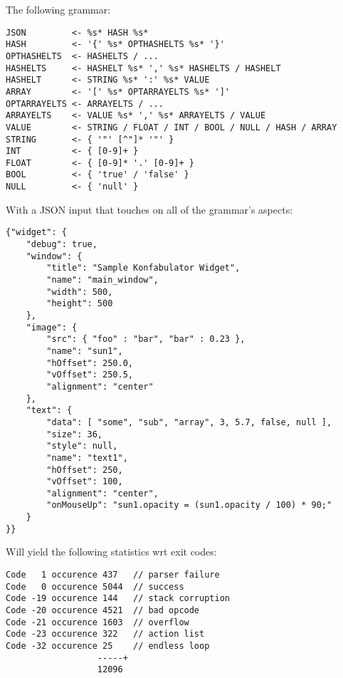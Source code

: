 The following grammar:

\begin{myquote}
\begin{verbatim}
JSON         <- %s* HASH %s*
HASH         <- '{' %s* OPTHASHELTS %s* '}'
OPTHASHELTS  <- HASHELTS / ...
HASHELTS     <- HASHELT %s* ',' %s* HASHELTS / HASHELT
HASHELT      <- STRING %s* ':' %s* VALUE
ARRAY        <- '[' %s* OPTARRAYELTS %s* ']'
OPTARRAYELTS <- ARRAYELTS / ...
ARRAYELTS    <- VALUE %s* ',' %s* ARRAYELTS / VALUE
VALUE        <- STRING / FLOAT / INT / BOOL / NULL / HASH / ARRAY
STRING       <- { '"' [^"]* '"' }
INT          <- { [0-9]+ }
FLOAT        <- { [0-9]* '.' [0-9]+ }
BOOL         <- { 'true' / 'false' }
NULL         <- { 'null' }

\end{verbatim}
\end{myquote}

With a JSON input that touches on all of the grammar's aspects:

\begin{myquote}
\begin{verbatim}
{"widget": {
    "debug": true,
    "window": {
        "title": "Sample Konfabulator Widget",
        "name": "main_window",
        "width": 500,
        "height": 500
    },
    "image": {
        "src": { "foo" : "bar", "bar" : 0.23 },
        "name": "sun1",
        "hOffset": 250.0,
        "vOffset": 250.5,
        "alignment": "center"
    },
    "text": {
        "data": [ "some", "sub", "array", 3, 5.7, false, null ],
        "size": 36,
        "style": null,
        "name": "text1",
        "hOffset": 250,
        "vOffset": 100,
        "alignment": "center",
        "onMouseUp": "sun1.opacity = (sun1.opacity / 100) * 90;"
    }
}}

\end{verbatim}
\end{myquote}

Will yield the following statistics wrt exit codes:

\begin{myquote}
\begin{verbatim}
Code   1 occurence 437   // parser failure
Code   0 occurence 5044  // success
Code -19 occurence 144   // stack corruption
Code -20 occurence 4521  // bad opcode
Code -21 occurence 1603  // overflow
Code -23 occurence 322   // action list
Code -32 occurence 25    // endless loop
                  -----+
                  12096

\end{verbatim}
\end{myquote}

